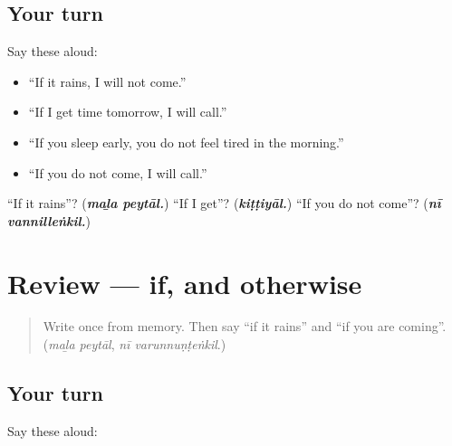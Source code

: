 \subsection*{Your turn}
Say these aloud:

\begin{itemize}
\raggedright
  \item \textquotedblleft{}If it rains, I will not come.\textquotedblright{}
  \item \textquotedblleft{}If I get time tomorrow, I will call.\textquotedblright{}
  \item \textquotedblleft{}If you sleep early, you do not feel tired in the morning.\textquotedblright{}
  \item \textquotedblleft{}If you do not come, I will call.\textquotedblright{}
\end{itemize}

\begin{tcolorbox}[breakable,colback=teal!4,colframe=teal!35!black,title={Before you move on}]
\textquotedblleft{}If it rains\textquotedblright{}? (\emph{\textbf{maḻa peytāl.}}) \textquotedblleft{}If I get\textquotedblright{}? (\emph{\textbf{kiṭṭiyāl.}}) \textquotedblleft{}If you do not come\textquotedblright{}? (\emph{\textbf{nī vannilleṅkil.}})
\end{tcolorbox}
\section[(review)]{Review — if, and otherwise}

\label{lesson:ML-R347-if-and-otherwise}



\begin{quote}
Write \textbf{} once from memory. Then say \textquotedblleft{}if it rains\textquotedblright{} and \textquotedblleft{}if you are coming\textquotedblright{}. (\emph{maḻa peytāl}, \emph{nī varunnuṇṭeṅkil}.)
\end{quote}

\subsection*{Your turn}
Say these aloud:

